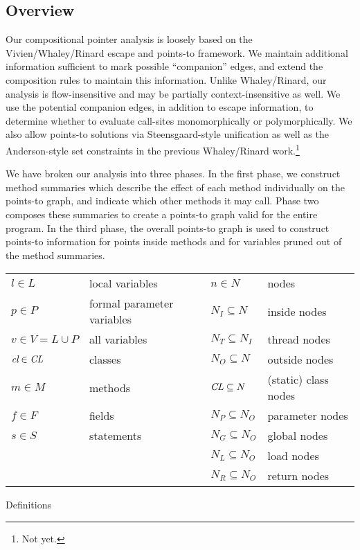 \documentclass[11pt,notitlepage]{article}
\newcommand{\bigvar}[1]{\ensuremath{\text{\it #1}}}
\begin{document}
\subsection{Overview}
Our compositional pointer analysis is loosely based on the Vivien/Whaley/Rinard
escape and points-to framework.  We maintain additional
information sufficient to mark possible ``companion'' edges, and
extend the composition rules to maintain this information.
Unlike Whaley/Rinard, our analysis is flow-insensitive
and may be partially context-insensitive as well.  
We use the potential companion edges, in addition to escape information,
to determine whether to evaluate call-sites monomorphically or
polymorphically.
We also allow points-to solutions via Steensgaard-style unification as well as
the Anderson-style set constraints in the previous Whaley/Rinard
work.\footnote{Not yet.}

We have broken our analysis into three phases.  In the first phase, we
construct method summaries which describe the effect of each method
individually on the points-to graph, and indicate which other methods
it may call.  Phase two composes these summaries to create a points-to
graph valid for the entire program.  In the third phase, the overall
points-to graph is used to construct points-to information for
points inside methods and for variables pruned out of the method
summaries.

\begin{myfigure}
\begin{tabular}{ll|ll}
$l\in L$ & local variables           &$n\in N$ & nodes\\
$p\in P$ & formal parameter variables&$N_I\subseteq N$ & inside nodes\\
$v\in V=L\cup P$& all variables      &$N_T\subseteq N_I$ & thread nodes\\
$\bigvar{cl}\in \bigvar{CL}$& classes&$N_O\subseteq N$ & outside nodes\\
$m\in M$ & methods                   &$\bigvar{CL}\subseteq N$ 
                                                       & (static) class nodes\\
$f\in F$ & fields                    &$N_P\subseteq N_O$ & parameter nodes\\
$s\in S$ & statements                &$N_G\subseteq N_O$ & global nodes\\
         &                           &$N_L\subseteq N_O$ & load nodes\\
         &                           &$N_R\subseteq N_O$ & return nodes\\
\end{tabular}
\caption{Definitions}
\label{fig:defin}
\end{myfigure}
\end{document}
